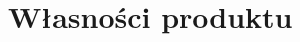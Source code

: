 \documentclass[12pt,a4paper,twoside]{article}
\begin{document}



\section{Własności produktu}





\end{document}
